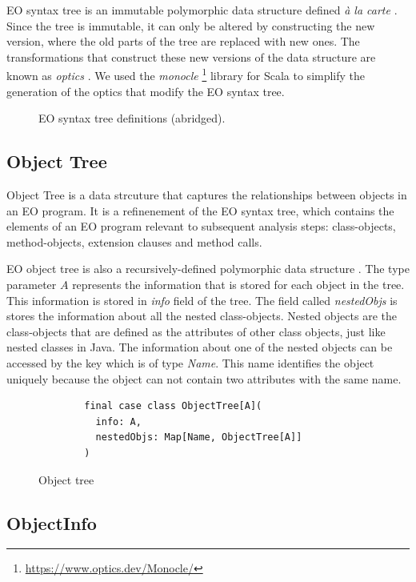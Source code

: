 EO syntax tree is an immutable polymorphic data structure defined \textit{à la carte} \cite{alacarte} . 
Since the tree is immutable, it can only be altered by constructing the new version, where the old parts of the tree are replaced with new ones. The transformations that construct these new versions of the data structure are known as \textit{optics} \cite{optics}. We used the \textit{monocle} \footnote{\url{https://www.optics.dev/Monocle/}} library for Scala to simplify the generation of the optics that modify the EO syntax tree.  

\begin{figure}
    
    \caption{EO syntax tree definitions (abridged).}
    \label{fig:ast}
\end{figure}
\subsection{Object Tree}
Object Tree is a data strcuture that captures the relationships between objects in an EO program. It is a refinenement of the EO syntax tree, which contains the elements of an EO program relevant to subsequent analysis steps: class-objects, method-objects, extension clauses and method calls. 

EO object tree is also a recursively-defined polymorphic data structure . The type parameter $A$ represents the information that is stored for each object in the tree. This information is stored in \textit{info} field of the tree. The field called \textit{nestedObjs} is stores the information about all the nested class-objects. Nested objects are the class-objects that are defined as the attributes of other class objects, just like nested classes in Java. The information about one of the nested objects can be accessed by the key which is of type \textit{Name}. This name identifies the object uniquely because the object can not contain two attributes with the same name.  

\begin{figure}
    \begin{lstlisting}
        final case class ObjectTree[A](
          info: A,
          nestedObjs: Map[Name, ObjectTree[A]]
        ) 
    \end{lstlisting}
    \caption{Object tree}
    \label{fig:objtree}
\end{figure}

\subsection{ObjectInfo}

